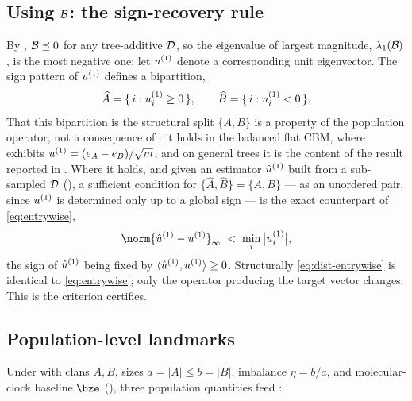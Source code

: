\subsection{Using \texorpdfstring{$\mathcal{B}$}{B}: the sign-recovery rule}\label{app:dist-signrule}

By , $\mathcal{B}\preceq0$ for any tree-additive $\mathcal{D}$, so the
eigenvalue of largest magnitude, $\lambda_1(\mathcal{B})$, is the most negative one; let
$u^{(1)}$ denote a corresponding unit eigenvector. The sign pattern of $u^{(1)}$
defines a bipartition,
\begin{equation}\label{eq:dist-sign-rule}
   \widehat A = \{\,i : u^{(1)}_i \ge 0\,\}, \qquad
   \widehat B = \{\,i : u^{(1)}_i < 0\,\}.
\end{equation}
That this bipartition is the structural split $\{A,B\}$ is a property of the
population operator, not a consequence of : it holds in
the balanced flat CBM, where  exhibits
$u^{(1)}=(e_A-e_B)/\sqrt m$, and on general trees it is the content of the result
reported in . Where it holds, and given an estimator
$\hat u^{(1)}$ built from a sub-sampled $\mathcal{D}$ (), a sufficient
condition for $\{\widehat A,\widehat B\}=\{A,B\}$ --- as an unordered pair, since
$u^{(1)}$ is determined only up to a global sign --- is the exact counterpart of
\eqref{eq:entrywise},
\begin{equation}\label{eq:dist-entrywise}
   \norm{\huone - \uone}_\infty \;<\; \min_i\,\bigl|\uone_i\bigr|,
\end{equation}
the sign of $\hat u^{(1)}$ being fixed by $\langle\hat u^{(1)},u^{(1)}\rangle\ge0$.
Structurally \eqref{eq:dist-entrywise} is identical to \eqref{eq:entrywise}; only
the operator producing the target vector changes. This is the criterion
 certifies.

\subsection{Population-level landmarks}\label{app:dist-landmarks}

Under  with clans $A,B$, sizes $a=|A|\le b=|B|$, imbalance
$\eta=b/a$, and molecular-clock baseline $\bze$ (), three
population quantities feed :

